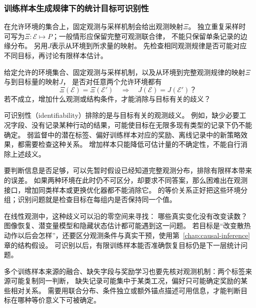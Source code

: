 \subsubsection{训练样本生成规律下的统计目标可识别性}
\label{sec:future-analysis-identification}

在允许环境的集合上，固定观测与采样机制会给出观测映射$\Xi$。
独立重复采样时可写为$\Xi:\mathcal E\mapsto P$；一般情形应保留完整可观测联合律，
不能只保留单条记录的边缘分布。
另用$J$表示从环境到所求量的映射。
先检查相同观测规律是否可能对应不同目标，再讨论有限样本估计。

\begin{mathproblem}[可观测规律是否确定所求量]
  \label{question:future-identification}
  给定允许的环境集合、固定观测与采样机制，以及从环境到完整观测规律的映射$\Xi$
  与到目标量的映射$J$，
  是否对任意两个允许环境都有
  \[
    \Xi(\mathcal E)=\Xi(\mathcal E')
    \quad\Longrightarrow\quad
    J(\mathcal E)=J(\mathcal E')\text{？}
  \]
  若不成立，增加什么观测或结构条件，才能消除与目标有关的歧义？
\end{mathproblem}

可识别性（identifiability）排除的是与目标有关的观测歧义。
例如，缺少必要工况字段、没有记录某种行动的结果，可能使目标在无限多现有类型的记录下仍不能确定。
弱监督中的潜在标签、偏好训练样本对应的奖励、离线记录中的新策略效果，都需要检查这种关系。
增加样本只能降低可估计量的不确定性，不能自行消除上述歧义。

要判断信息是否足够，可以先暂时假设已经知道完整观测分布，排除有限样本带来的误差。
如果两种环境在此时仍不可区分，却要求不同答案，那么困难出在观测接口，增加同类样本或更换优化器都不能消除它。
的等价关系正好把这些环境分组；识别问题就是检查目标在每组内是否保持同一个值。

在线性观测中，这种歧义可以沿的零空间来寻找：
哪些真实变化没有改变读数？图像恢复、潜变量模型和隐藏状态估计都可能遇到这一问题。
若目标是“改变散热动作以后会怎样”，还要区分观测条件与真实干预，使用第~\ref{chap:causal-inference}章的结构假设。
可识别以后，有限训练样本能否准确恢复目标仍是下一层统计问题。

多个训练样本来源的融合、缺失字段与奖励学习也要先核对观测机制：两个标签来源可能复制同一判断，
缺失记录可能集中于某类工况，偏好只可能确定奖励的某些相对关系。
需要用联合分布、条件独立或额外锚点描述可用信息，才能判断目标在哪种等价意义下可被确定。

